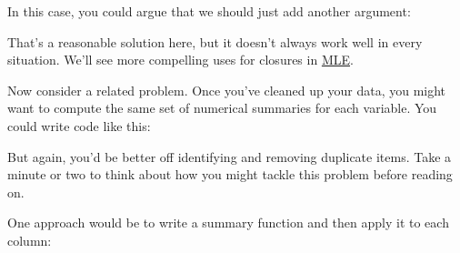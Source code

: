 \begin{shortbox}

In this case, you could argue that we should just add another argument:

\begin{Shaded}
\begin{Highlighting}[]
\StringTok{ }
  \NormalTok{x[x ==}\StringTok{ }\NormalTok{na.value] <-}\StringTok{ }
\NormalTok{\}}
\end{Highlighting}
\end{Shaded}

That's a reasonable solution here, but it doesn't always work well in
every situation. We'll see more compelling uses for closures in
\hyperref[functionals-math]{MLE}.

\end{shortbox}

Now consider a related problem. Once you've cleaned up your data, you
might want to compute the same set of numerical summaries for each
variable. You could write code like this:

\begin{Shaded}
\begin{Highlighting}[]

\end{Highlighting}
\end{Shaded}

But again, you'd be better off identifying and removing duplicate items.
Take a minute or two to think about how you might tackle this problem
before reading on.

One approach would be to write a summary function and then apply it to
each column:

\begin{Shaded}
\begin{Highlighting}[]
\StringTok{ }
  \NormalTok{(}
\NormalTok{\}}
\end{Highlighting}
\end{Shaded}

